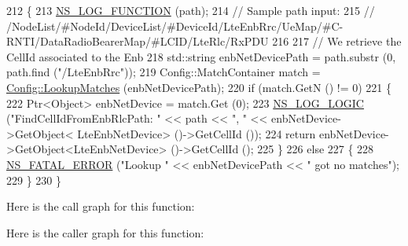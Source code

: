 \begin{DoxyCode}
212 \{
213   \hyperlink{log-macros-disabled_8h_a90b90d5bad1f39cb1b64923ea94c0761}{NS\_LOG\_FUNCTION} (path);
214   \textcolor{comment}{// Sample path input:}
215   \textcolor{comment}{// /NodeList/#NodeId/DeviceList/#DeviceId/LteEnbRrc/UeMap/#C-RNTI/DataRadioBearerMap/#LCID/LteRlc/RxPDU}
216 
217   \textcolor{comment}{// We retrieve the CellId associated to the Enb}
218   std::string enbNetDevicePath = path.substr (0, path.find (\textcolor{stringliteral}{"/LteEnbRrc"}));
219   Config::MatchContainer match = \hyperlink{group__config_ga74aeb63f8f50b4a98043351552ef7db6}{Config::LookupMatches} (enbNetDevicePath);
220   \textcolor{keywordflow}{if} (match.GetN () != 0)
221     \{
222       Ptr<Object> enbNetDevice = match.Get (0);
223       \hyperlink{group__logging_ga88acd260151caf2db9c0fc84997f45ce}{NS\_LOG\_LOGIC} (\textcolor{stringliteral}{"FindCellIdFromEnbRlcPath: "} << path << \textcolor{stringliteral}{", "} << enbNetDevice->GetObject<
      LteEnbNetDevice> ()->GetCellId ());
224       \textcolor{keywordflow}{return} enbNetDevice->GetObject<LteEnbNetDevice> ()->GetCellId ();
225     \}
226   \textcolor{keywordflow}{else}
227     \{
228       \hyperlink{group__fatal_ga5131d5e3f75d7d4cbfd706ac456fdc85}{NS\_FATAL\_ERROR} (\textcolor{stringliteral}{"Lookup "} << enbNetDevicePath << \textcolor{stringliteral}{" got no matches"});
229     \}
230 \}
\end{DoxyCode}


Here is the call graph for this function\+:




Here is the caller graph for this function\+:


